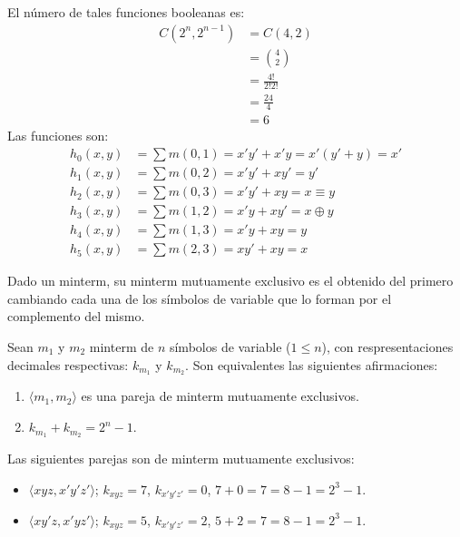 \begin{solution}
  El número de tales funciones booleanas es:
  \begin{align*}
    C(2^{n},2^{n-1})&=C(4,2)\\
                    &=\binom{4}{2}\\
                    &=\frac{4!}{2!2!}\\
                    &=\frac{24}{4}\\
                    &=6
  \end{align*}
  Las funciones son:
  \begin{align*}
    h_{0}(x,y)&=\sum m(0,1)=x'y'+x'y=x'(y'+y)=x'\\
    h_{1}(x,y)&=\sum m(0,2)=x'y'+xy'=y'\\
    h_{2}(x,y)&=\sum m(0,3)=x'y'+xy=x\equiv y\\
    h_{3}(x,y)&=\sum m(1,2)=x'y+xy'=x\oplus y\\
    h_{4}(x,y)&=\sum m(1,3)=x'y+xy=y\\
    h_{5}(x,y)&=\sum m(2,3)=xy'+xy=x
  \end{align*}
\end{solution}

\begin{definition}
  Dado un minterm, su minterm mutuamente exclusivo es el obtenido
  del primero cambiando cada una de los símbolos de variable que lo
  forman por el complemento del mismo.
\end{definition}

\begin{lemma}
  Sean $m_{1}$ y $m_{2}$ minterm de $n$ símbolos de variable
  ($1\leq n$), con respresentaciones decimales respectivas:
  $k_{m_{1}}$ y $k_{m_{2}}$. Son equivalentes las siguientes
  afirmaciones:
  \begin{enumerate}
  \item $\langle m_{1},m_{2}\rangle$ es una pareja de minterm
    mutuamente exclusivos.
  \item $k_{m_{1}}+k_{m_{2}}=2^{n}-1$.
  \end{enumerate}
\end{lemma}

\begin{example}
  Las siguientes parejas son de minterm mutuamente exclusivos:
  \begin{itemize}
  \item $\langle xyz,x'y'z'\rangle$; $k_{xyz}=7$, $k_{x'y'z'}=0$,
    $7+0=7=8-1=2^{3}-1$. 
  \item $\langle xy'z,x'yz'\rangle$; $k_{xyz}=5$, $k_{x'y'z'}=2$,
    $5+2=7=8-1=2^{3}-1$.
  \end{itemize}
\end{example}

